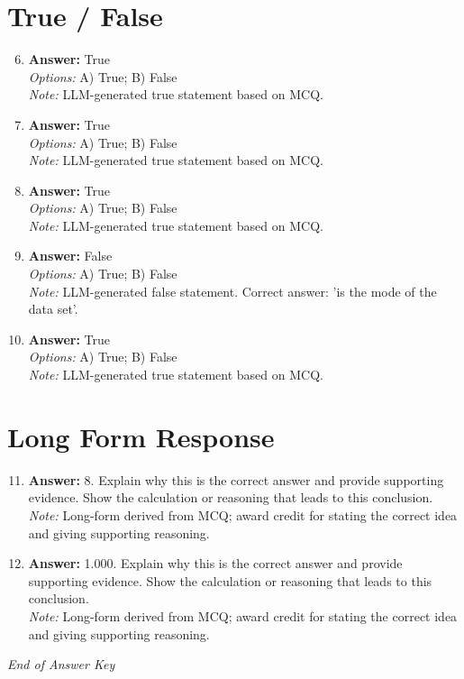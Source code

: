 \documentclass[12pt]{article}
\begin{document}
\section*{True / False}
\begin{enumerate}[label=\arabic*.]
\setcounter{enumi}{5}
\item \textbf{Answer:} True
\\ \textit{Options:} A) True; B) False
\\ \textit{Note:} LLM-generated true statement based on MCQ.
\item \textbf{Answer:} True
\\ \textit{Options:} A) True; B) False
\\ \textit{Note:} LLM-generated true statement based on MCQ.
\item \textbf{Answer:} True
\\ \textit{Options:} A) True; B) False
\\ \textit{Note:} LLM-generated true statement based on MCQ.
\item \textbf{Answer:} False
\\ \textit{Options:} A) True; B) False
\\ \textit{Note:} LLM-generated false statement. Correct answer: 'is the mode of the data set'.
\item \textbf{Answer:} True
\\ \textit{Options:} A) True; B) False
\\ \textit{Note:} LLM-generated true statement based on MCQ.
\end{enumerate}

\section*{Long Form Response}
\begin{enumerate}[label=\arabic*.]
\setcounter{enumi}{10}
\item \textbf{Answer:} 8. Explain why this is the correct answer and provide supporting evidence. Show the calculation or reasoning that leads to this conclusion.
\\ \textit{Note:} Long-form derived from MCQ; award credit for stating the correct idea and giving supporting reasoning.
\item \textbf{Answer:} 1.000. Explain why this is the correct answer and provide supporting evidence. Show the calculation or reasoning that leads to this conclusion.
\\ \textit{Note:} Long-form derived from MCQ; award credit for stating the correct idea and giving supporting reasoning.
\end{enumerate}

\vfill
\noindent\textit{End of Answer Key}
\end{document}
